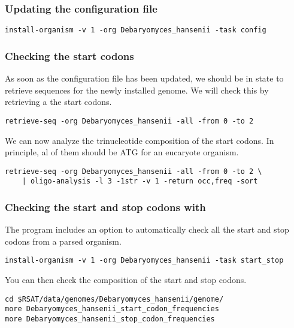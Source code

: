 \subsubsection{Updating the configuration file}

\begin{verbatim}
install-organism -v 1 -org Debaryomyces_hansenii -task config
\end{verbatim}

\subsubsection{Checking the start codons}

As soon as the configuration file has been updated, we should be in
state to retrieve sequences for the newly installed genome. We will
check this by retrieving a the start codons.

\begin{verbatim}
retrieve-seq -org Debaryomyces_hansenii -all -from 0 -to 2
\end{verbatim}

We can now analyze the trinucleotide composition of the start
 codons. In principle, al of them should be ATG for an eucaryote
 organism.

\begin{verbatim}
retrieve-seq -org Debaryomyces_hansenii -all -from 0 -to 2 \
    | oligo-analysis -l 3 -1str -v 1 -return occ,freq -sort
\end{verbatim}

\subsubsection{Checking the start and stop codons with }

The program  includes an option to
automatically check all the start and stop codons from a parsed
organism.

\begin{verbatim}
install-organism -v 1 -org Debaryomyces_hansenii -task start_stop
\end{verbatim}

You can then check the composition of the start and stop codons.

\begin{verbatim}
cd $RSAT/data/genomes/Debaryomyces_hansenii/genome/
more Debaryomyces_hansenii_start_codon_frequencies
more Debaryomyces_hansenii_stop_codon_frequencies
\end{verbatim}

